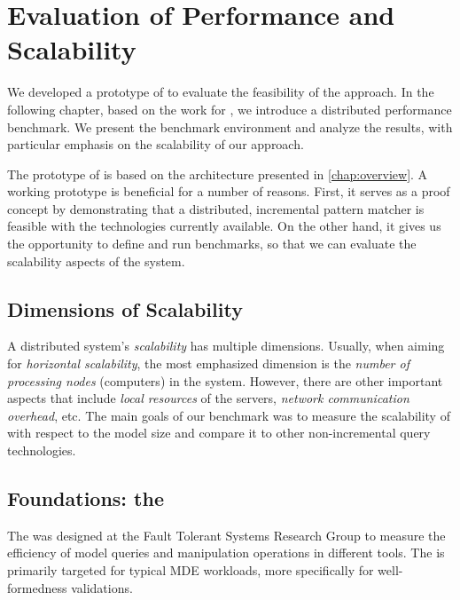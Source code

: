 \chapter{Evaluation of Performance and Scalability}
\label{chap:evaluation}

We developed a prototype of \iqd{} to evaluate the feasibility of the approach. In the following chapter, based on the work for \eiq{}, we introduce a distributed performance benchmark. We present the benchmark environment and analyze the results, with particular emphasis on the scalability of our approach. 


The prototype of \iqd{} is based on the architecture presented in \autoref{chap:overview}. A working prototype is beneficial for a number of reasons. First, it serves as a proof concept by demonstrating that a distributed, incremental pattern matcher is feasible with the technologies currently available.
On the other hand, it gives us the opportunity to define and run benchmarks, so that we can evaluate the scalability aspects of the system.

\section{Dimensions of Scalability}

A distributed system's \emph{scalability} has multiple dimensions. Usually, when aiming for \emph{horizontal scalability}, the most emphasized dimension is the \emph{number of processing nodes} (computers) in the system. However, there are other important aspects that include \emph{local resources} of the servers, \emph{network communication overhead}, etc. The main goals of our benchmark was to measure the scalability of \iqd{} with respect to the model size and compare it to other non-incremental query technologies. 


\section{Foundations: the \tb{}}
\label{trainbenchmark}

The \tb{} was designed at the Fault Tolerant Systems Research Group \cite{high-performance-queries, ASE2013} to measure the efficiency of model queries and manipulation operations in different tools. The \tb{} is primarily targeted for typical MDE workloads, more specifically for well-formedness validations.


